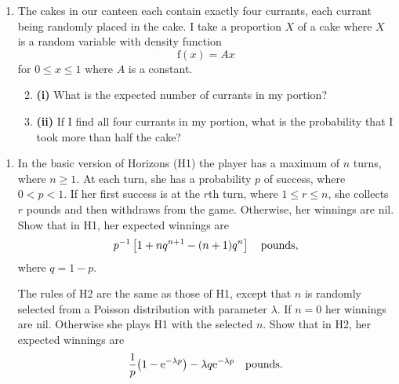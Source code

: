 \documentclass[a4, 11pt]{report}
\newlength{\qspace}
\newcounter{qnumber}
\newenvironment{question}%
 {\vspace{\qspace}
  \begin{enumerate}[\bfseries 1\quad][10]%
    \setcounter{enumi}{\value{qnumber}}%
    \item%
 }
{
  \end{enumerate}
  \filbreak
  \stepcounter{qnumber}
 }
\newenvironment{questionparts}[1][1]%
 {
  \begin{enumerate}[\bfseries (i)]%
    \setcounter{enumii}{#1}
    \addtocounter{enumii}{-1}
    \setlength{\itemsep}{5mm}
    \setlength{\parskip}{8pt}
 }
 {
  \end{enumerate}
 }
\def\e{{\mathrm e}}
\def\le{\leqslant}
\def\ge{\geqslant}
\begin{document}
\begin{question}
The cakes in our canteen each contain
exactly four currants, each currant being   randomly placed in the cake.
I take a proportion $X$ of a cake where $X$ is a random 
variable with density function
\[{\mathrm f}(x)=Ax\]
for $0\leqslant x\leqslant 1$ where $A$ is a constant.

\begin{questionparts}
\item[\bf(i)] What is the expected number of currants in my
portion?

\item[\bf(ii)] If I find all  four currants in my portion,
what is the probability that I took more than
half the cake?
\end{questionparts}

\end{question}

\begin{question}
In the basic version of Horizons (H1) the player has 
a maximum of $n$ turns, where $n \ge 1$.
At each turn, she has a probability $p$ 
of success, where $0 < p < 1$. If her first success is at the 
$r$th turn, where $1 \le r \le n$, she collects $r$ pounds 
and then withdraws from the game. Otherwise, her winnings are nil.
Show that  in H1, her expected winnings are
$$
p^{-1}\left[1+nq^{n+1}-(n+1)q^n\right]\quad\hbox{pounds},
$$
where $q=1-p$.

The rules of H2 are the same as those of H1, except that
$n$ is randomly selected from a Poisson distribution 
with parameter $\lambda$. If $n=0$ her winnings are nil. 
Otherwise she plays H1 with the selected $n$.
Show that in H2, her expected winnings are
$$ 
{1 \over p}{\left(1-{\e^{-{\lambda}p}}\right)}
    -{{\lambda}q}{\e^{-{\lambda}p}}
\quad\hbox{pounds}.
$$

\end{question}
	
\end{document}
